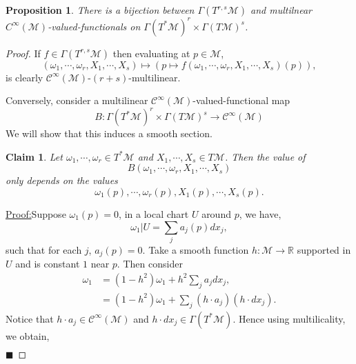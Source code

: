 \documentclass[8pt]{article}
\newtheorem{proposition}{Proposition}[section]
\newtheorem{claim}{Claim}
\newenvironment{claimproof}[1]{\par\noindent\underline{Proof:}\space#1}{\hfill $\blacksquare$}
\newcommand{\R}[0]{\mathbb{R}}
\newcommand{\M}[0]{\mathcal{M}}
\newcommand{\cinf}[0]{\mathcal{C}^\infty}
\begin{document}
\begin{proposition}
  \label{proposition_12_4}
  There is a bijection between $\Gamma(T^{r,s}\mathcal{M})$ and multilnear $C^\infty(\mathcal{M})$-valued-functionals on $\Gamma(T^*\mathcal{M})^r\times \Gamma(T\mathcal{M})^s$.
\end{proposition}
\begin{proof} If $f\in\Gamma(T^{r,s}\M)$ then evaluating at $p\in\M$,
\begin{equation*}
  (\omega_1,\cdots,\omega_r,X_1,\cdots,X_s)\mapsto (p\mapsto f(\omega_1,\cdots,\omega_r,X_1,\cdots, X_s)(p)),
\end{equation*}
is clearly $\cinf(\M)$-$(r+s)$-multilinear.
\par Conversely, consider a multilinear $\cinf(\M)$-valued-functional map 
\begin{equation*}
  B:\Gamma(T^*\mathcal{M})^r\times \Gamma(T\mathcal{M})^s\to \cinf(\M)
\end{equation*}
We will show that this induces a smooth section. 
\setcounter{claim}{0}
\begin{claim}
  Let $\omega_1,\cdots,\omega_r\in T^*\M$ and $X_1,\cdots,X_s\in T\M$. Then the value of 
  \begin{equation*}
    B(\omega_1,\cdots,\omega_r,X_1,\cdots,X_s)
  \end{equation*}
  only depends on the values
  \begin{equation*}
    \omega_1(p),\cdots,\omega_r(p),X_1(p),\cdots,X_s(p).
  \end{equation*}
\end{claim}
\begin{claimproof}
  Suppose $\omega_1(p)=0$, in a local chart $U$ around $p$, we have,
  \begin{equation*}
    \omega_1|U = \sum_{j}a_j(p)dx_j,
  \end{equation*}
  such that for each $j$, $a_j(p) = 0$. Take a smooth function $h:\M\to \R$ supported in $U$ and is constant $1$ near $p$.
  Then consider
  \begin{align*}
    \omega_1 & = (1-h^2)\omega_1+h^2\sum_{j}a_jdx_j,\\
    & = (1-h^2)\omega_1+\sum_{j}(h\cdot a_j)(h\cdot dx_j).
  \end{align*}
  Notice that $h\cdot a_j\in\cinf(\M)$ and $h\cdot dx_j\in\Gamma(T^*\M)$.
  Hence using multilicality, we obtain,
  \begin{align*}

\end{align*}
\end{claimproof}
\end{proof}
\end{document}
